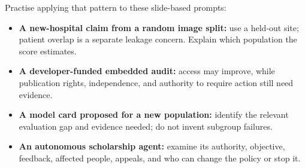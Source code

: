 \documentclass[11pt,letterpaper]{article}
\begin{document}
Practise applying that pattern to these slide-based prompts:
\begin{itemize}
\item \textbf{A new-hospital claim from a random image split:} use a held-out site;
patient overlap is a separate leakage concern. Explain which population the score estimates.
\item \textbf{A developer-funded embedded audit:} access may improve, while
publication rights, independence, and authority to require action still need evidence.
\item \textbf{A model card proposed for a new population:} identify the relevant
evaluation gap and evidence needed; do not invent subgroup failures.
\item \textbf{An autonomous scholarship agent:} examine its authority, objective,
feedback, affected people, appeals, and who can change the policy or stop it.
\end{itemize}

\end{document}

